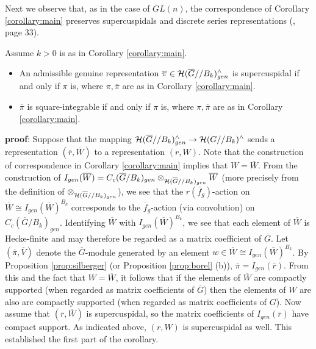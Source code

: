 Next we observe that, as in the case
of $GL(n)$, the correspondence of Corollary \ref{corollary:main}
preserves supercuspidals and discrete series 
representations (\cite{H}, page 33).

\begin{corollary}
Assume $k>0$ is as in Corollary \ref{corollary:main}.
\begin{itemize}
\item An admissible genuine representation
$\overline{\pi}\in
{\cal H}(\overline{G}//B_k)_{gen}^\wedge$ 
is supercuspidal if and only if
$\pi$ is, where $\pi,\overline{\pi}$ are as in Corollary
\ref{corollary:main}.

\item
$\overline{\pi}$ is square-integrable 
if and only if $\pi$ is, where $\pi,\overline{\pi}$ 
are as in Corollary \ref{corollary:main}.
\end{itemize}
\end{corollary}

{\bf proof}: Suppose that the mapping
${\cal H}(\overline{G}//B_k)_{gen}^\wedge
\rightarrow {\cal H}(G//B_k)^\wedge$
sends a representation $(\overline{r},\overline{W})$ 
to a representation $(r,W)$. Note that the construction of
correspondence in Corollary \ref{corollary:main} implies that
$W=\overline{W}$.
From the construction of $I_{gen}(\overline{W})=
C_c(\overline{G}/B_k)_{gen}
\otimes_{{\cal H}(\overline{G}//B_k)_{gen}}\overline{W}$
(more precisely from the definition of 
$\otimes_{{\cal H}(\overline{G}//B_k)_{gen}}$), we
see that the $r(\overline{f}_g)$-action on 
$\overline{W}\cong I_{gen}(\overline{W})^{B_k}$
corresponds to the $\overline{f}_g$-action (via convolution)
on $C_c(\overline{G}/B_k)_{gen}$. 
Identifying $\overline{W}$ with $I_{gen}(\overline{W})^{B_k}$, 
we see that each element of
$\overline{W}$ is Hecke-finite and may therefore be regarded as 
a matrix coefficient of
$\overline{G}$. Let $(\overline{\pi},\overline{V})$
denote the $\overline{G}$-module generated by
an element $w\in \overline{W}\cong I_{gen}(\overline{W})^{B_k}$. 
By Proposition \ref{prop:silberger} (or Proposition \ref{prop:borel} (b)), 
$\overline{\pi}=I_{gen}(\overline{r})$.
From this and the fact that $W=\overline{W}$, it 
follows that if the elements of $\overline{W}$
are compactly supported (when regarded as matrix coefficients of $\overline{G}$)
then the elements of $W$ are also are compactly supported
(when regarded as matrix coefficients of $G$).
Now assume that $(\overline{r},\overline{W})$ is
supercuspidal, so the matrix coefficients of $I_{gen}(\overline{r})$
have compact support. As indicated above, $(r,W)$ is supercuspidal as well. 
This established the first part of the corollary.

